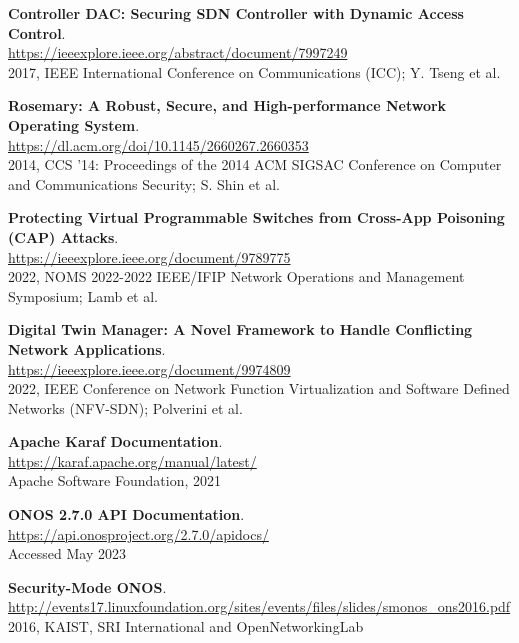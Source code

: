 \documentclass[a4paper,10pt]{memoir}
\begin{document}
{\begin{thebibliography}{9}
  \textbf{Controller DAC: Securing SDN Controller with Dynamic Access Control}.\\
  \href{https://ieeexplore.ieee.org/abstract/document/7997249}{https://ieeexplore.ieee.org/abstract/document/7997249}\\
  2017, IEEE International Conference on Communications (ICC); Y. Tseng et al.
  
  \textbf{Rosemary: A Robust, Secure, and High-performance Network Operating System}.\\
  \href{https://dl.acm.org/doi/10.1145/2660267.2660353}{https://dl.acm.org/doi/10.1145/2660267.2660353}\\
  2014, CCS '14: Proceedings of the 2014 ACM SIGSAC Conference on Computer and Communications Security; S. Shin et al.

  \textbf{Protecting Virtual Programmable Switches from Cross-App Poisoning (CAP) Attacks}.\\
  \href{https://ieeexplore.ieee.org/document/9789775}{https://ieeexplore.ieee.org/document/9789775}\\
  2022, NOMS 2022-2022 IEEE/IFIP Network Operations and Management Symposium; Lamb et al.

  \textbf{Digital Twin Manager: A Novel Framework to Handle Conflicting Network Applications}.\\
  \href{https://ieeexplore.ieee.org/document/9974809}{https://ieeexplore.ieee.org/document/9974809}\\
  2022, IEEE Conference on Network Function Virtualization and Software Defined Networks (NFV-SDN); Polverini et al.

  \textbf{Apache Karaf Documentation}.\\
  \href{https://karaf.apache.org/manual/latest/}{https://karaf.apache.org/manual/latest/}\\
  Apache Software Foundation, 2021

  \textbf{ONOS 2.7.0 API Documentation}.\\
  \href{https://api.onosproject.org/2.7.0/apidocs/}{https://api.onosproject.org/2.7.0/apidocs/}\\
  Accessed May 2023

  \textbf{Security-Mode ONOS}.\\
  \href{http://events17.linuxfoundation.org/sites/events/files/slides/smonos_ons2016.pdf}{http://events17.linuxfoundation.org/sites/events/files/slides/smonos\_ons2016.pdf}\\
  2016, KAIST, SRI International and OpenNetworkingLab


\end{thebibliography}}
\end{document}
